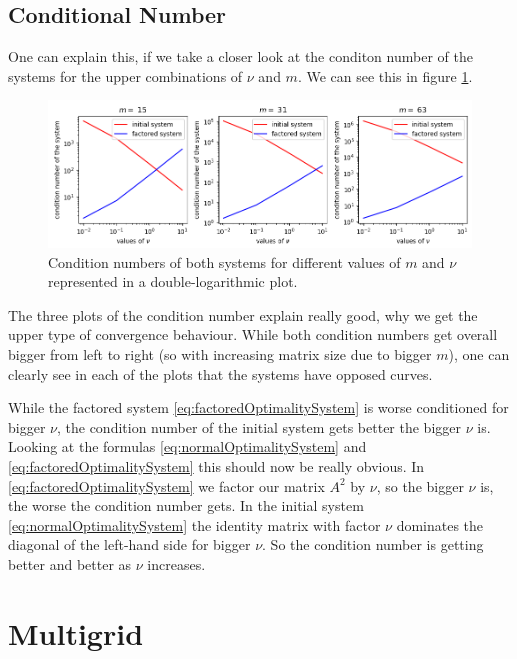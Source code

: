 \documentclass{amsart}
\theoremstyle{definition}
\theoremstyle{remark}
\numberwithin{equation}{section}
\begin{document}
\subsection{Conditional Number}
One can explain this, if we take a closer look at the conditon number of the systems for the upper combinations of $\nu$ and $m$. We can see this in 
figure \ref{fig:CG-conditionNumber}.
\begin{figure}[h!]
\centering
\includegraphics[scale=0.65]{./imgs/CG_conditionNumber}
\caption{Condition numbers of both systems for different values of $m$ and $\nu$ represented in a double-logarithmic plot.}
\label{fig:CG-conditionNumber}
\end{figure}
The three plots of the condition number explain really good, why we get the upper type of convergence behaviour. While both condition numbers get overall
bigger from left to right (so with increasing matrix size due to bigger $m$), one can clearly see in each of the plots that the systems have opposed 
curves.

While the factored system \eqref{eq:factoredOptimalitySystem} is worse conditioned for bigger $\nu$, the condition number of the initial system 
gets better the bigger $\nu$ is. Looking at the formulas \eqref{eq:normalOptimalitySystem} and \eqref{eq:factoredOptimalitySystem} this should now be 
really obvious.
In \eqref{eq:factoredOptimalitySystem} we factor our matrix $A^2$ by $\nu$, so the bigger $\nu$ is, the worse the condition number gets. In the initial 
system \eqref{eq:normalOptimalitySystem} the identity matrix with factor $\nu$ dominates the diagonal of the left-hand side for bigger $\nu$. So the 
condition number is getting better and better as $\nu$ increases.


\section{Multigrid}

\end{document}
